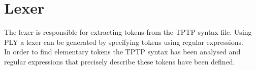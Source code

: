 \section{Lexer}\label{sec:ConceptLexer}
The lexer is responsible for extracting tokens from the \ac{TPTP} syntax file. Using \ac{PLY} a lexer can be generated by specifying tokens using regular expressions.\\
In order to find elementary tokens the \ac{TPTP} syntax has been analysed and regular expressions that precisely describe these tokens have been defined.

%

